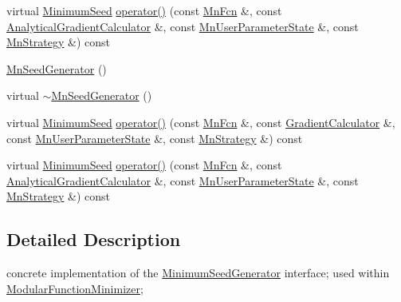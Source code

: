 \begin{DoxyCompactItemize}
\item 
virtual \mbox{\hyperlink{classROOT_1_1Minuit2_1_1MinimumSeed}{Minimum\+Seed}} \mbox{\hyperlink{classROOT_1_1Minuit2_1_1MnSeedGenerator_aeba9e3b985e5d74e797cafaffec74de3}{operator()}} (const \mbox{\hyperlink{classROOT_1_1Minuit2_1_1MnFcn}{Mn\+Fcn}} \&, const \mbox{\hyperlink{classROOT_1_1Minuit2_1_1AnalyticalGradientCalculator}{Analytical\+Gradient\+Calculator}} \&, const \mbox{\hyperlink{classROOT_1_1Minuit2_1_1MnUserParameterState}{Mn\+User\+Parameter\+State}} \&, const \mbox{\hyperlink{classROOT_1_1Minuit2_1_1MnStrategy}{Mn\+Strategy}} \&) const
\item 
\mbox{\hyperlink{classROOT_1_1Minuit2_1_1MnSeedGenerator_ad3ed7b1fc379dd74ba7af16279f77e90}{Mn\+Seed\+Generator}} ()
\item 
virtual \mbox{\hyperlink{classROOT_1_1Minuit2_1_1MnSeedGenerator_a3dee518720bebaac31b0bdd5b64c9856}{$\sim$\+Mn\+Seed\+Generator}} ()
\item 
virtual \mbox{\hyperlink{classROOT_1_1Minuit2_1_1MinimumSeed}{Minimum\+Seed}} \mbox{\hyperlink{classROOT_1_1Minuit2_1_1MnSeedGenerator_a1c06ece239f548163beb232600dc8cc3}{operator()}} (const \mbox{\hyperlink{classROOT_1_1Minuit2_1_1MnFcn}{Mn\+Fcn}} \&, const \mbox{\hyperlink{classROOT_1_1Minuit2_1_1GradientCalculator}{Gradient\+Calculator}} \&, const \mbox{\hyperlink{classROOT_1_1Minuit2_1_1MnUserParameterState}{Mn\+User\+Parameter\+State}} \&, const \mbox{\hyperlink{classROOT_1_1Minuit2_1_1MnStrategy}{Mn\+Strategy}} \&) const
\item 
virtual \mbox{\hyperlink{classROOT_1_1Minuit2_1_1MinimumSeed}{Minimum\+Seed}} \mbox{\hyperlink{classROOT_1_1Minuit2_1_1MnSeedGenerator_aeba9e3b985e5d74e797cafaffec74de3}{operator()}} (const \mbox{\hyperlink{classROOT_1_1Minuit2_1_1MnFcn}{Mn\+Fcn}} \&, const \mbox{\hyperlink{classROOT_1_1Minuit2_1_1AnalyticalGradientCalculator}{Analytical\+Gradient\+Calculator}} \&, const \mbox{\hyperlink{classROOT_1_1Minuit2_1_1MnUserParameterState}{Mn\+User\+Parameter\+State}} \&, const \mbox{\hyperlink{classROOT_1_1Minuit2_1_1MnStrategy}{Mn\+Strategy}} \&) const
\end{DoxyCompactItemize}


\subsection{Detailed Description}
concrete implementation of the \mbox{\hyperlink{classROOT_1_1Minuit2_1_1MinimumSeedGenerator}{Minimum\+Seed\+Generator}} interface; used within \mbox{\hyperlink{classROOT_1_1Minuit2_1_1ModularFunctionMinimizer}{Modular\+Function\+Minimizer}}; 

